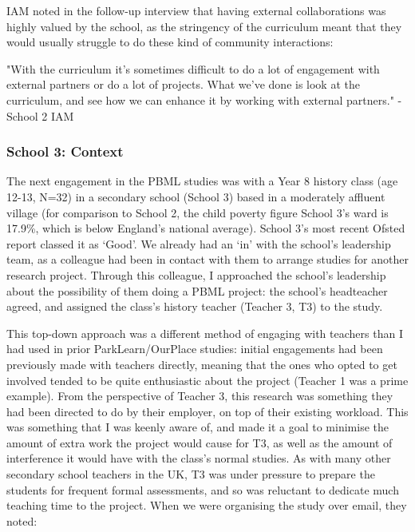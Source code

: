 IAM noted in the follow-up interview that having external collaborations was highly valued by the school, as the stringency of the curriculum meant that they would usually struggle to do these kind of community interactions:

\begin{displayquote}
"With the curriculum it's sometimes difficult to do a lot of engagement with external partners or do a lot of projects. What we've done is look at the curriculum, and see how we can enhance it by working with external partners." - School 2 IAM
\end{displayquote}

\subsubsection{School 3: Context}

The next engagement in the PBML studies was with a Year 8 history class (age 12-13, N=32) in a secondary school (School 3) based in a moderately affluent village (for comparison to School 2, the child poverty figure School 3's ward is 17.9\%, which is below England's national average). School 3's most recent Ofsted report classed it as `Good'. We already had an `in' with the school's leadership team, as a colleague had been in contact with them to arrange studies for another research project. Through this colleague, I approached the school's leadership about the possibility of them doing a PBML project: the school's headteacher agreed, and assigned the class's history teacher (Teacher 3, T3) to the study. 

This top-down approach was a different method of engaging with teachers than I had used in prior ParkLearn/OurPlace studies: initial engagements had been previously made with teachers directly, meaning that the ones who opted to get involved tended to be quite enthusiastic about the project (Teacher 1 was a prime example). From the perspective of Teacher 3, this research was something they had been directed to do by their employer, on top of their existing workload. This was something that I was keenly aware of, and made it a goal to minimise the amount of extra work the project would cause for T3, as well as the amount of interference it would have with the class's normal studies. As with many other secondary school teachers in the UK, T3 was under pressure to prepare the students for frequent formal assessments, and so was reluctant to dedicate much teaching time to the project. When we were organising the study over email, they noted:

